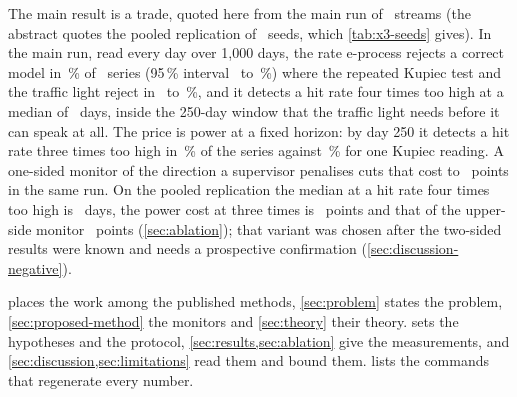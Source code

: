 The main result is a trade, quoted here from the main run of \nReps\ streams (the abstract quotes the pooled replication of \nSeedsCount\ seeds, which \cref{tab:x3-seeds} gives). In the main run, read every day over 1,000 days, the rate e-process rejects a correct model in \nNullSizeE\,\% of \nReps\ series (95\,\% interval \nNullSizeELo\ to \nNullSizeEHi\,\%)
where the repeated Kupiec test and the traffic light reject in \nNullSizeKupCum\ to \nNullSizeKupTrail\,\%, and it detects a hit rate four times too high at a median of
\nMedFourE\ days, inside the 250-day window that the traffic light needs before it can speak at all. The price is power at a fixed horizon: by day 250 it detects a hit rate
three times too high in \nByThreeE\,\% of the series against \nShotThree\,\% for one Kupiec reading. A one-sided monitor of the direction a supervisor penalises cuts that cost to \nCostThreeEUp\ points in the same run. On the pooled replication the median at a hit rate four times too high is \nSeedsFourMed\ days, the power cost at three times is \nSeedsThreeCost\ points and that of the upper-side monitor \nSeedsUpThreeCost\ points
(\cref{sec:ablation}); that variant was chosen after the two-sided results were known and needs a prospective confirmation (\cref{sec:discussion-negative}).

 places the work among the published methods, \cref{sec:problem} states the problem, \cref{sec:proposed-method} the monitors and \cref{sec:theory} their theory.
 sets the hypotheses and the protocol, \cref{sec:results,sec:ablation} give the measurements, and \cref{sec:discussion,sec:limitations}
read them and bound them.  lists the commands that regenerate every number.
